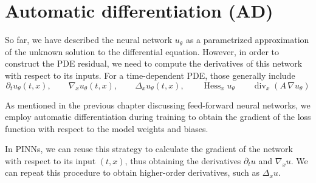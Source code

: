 \section{Automatic differentiation (AD)}
%
%


So far, we have described the neural network $u_\theta$ as a parametrized approximation of the unknown solution to the differential equation.
However, in order to construct the PDE residual, we need to compute the derivatives of this network with respect to its inputs.
For a time-dependent PDE, those generally include
\[
    \partial_t u_\theta(t,x),
    \qquad
    \nabla_x u_\theta(t,x),
    \qquad
    \Delta_x u_\theta(t,x),
    \qquad
    \operatorname{Hess}_x u_\theta
    \qquad
    \operatorname{div}_x(A\,\nabla u_\theta)
\]

As mentioned in the previous chapter discussing feed-forward neural networks,
we employ automatic differentiation during training
to obtain the gradient of the loss function
with respect to the model weights and biases.

In PINNs, we can reuse this strategy to calculate the gradient of the network with respect to its input $(t,x)$,
thus obtaining the derivatives $\partial_t u$ and $\nabla_x u$.
We can repeat this procedure to obtain higher-order derivatives, such as $\Delta_x u$.

